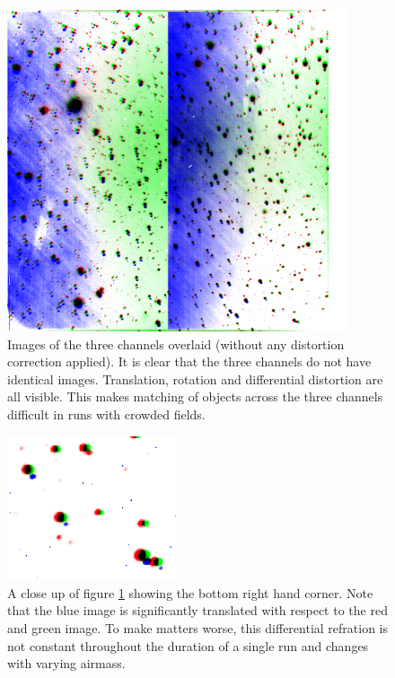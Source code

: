 \begin{figure}
  \centering
  \includegraphics[width=100mm]{images/overlay_multiply.png}
  \caption{Images of the three channels overlaid (without any distortion correction applied). It is clear that the three channels do not have identical images. Translation, rotation and differential distortion are all visible. This makes matching of objects across the three channels difficult in runs with crowded fields. }
\label{fig:nonoverlap}
\end{figure}

\begin{figure}
  \centering
  \includegraphics[width=50mm]{images/overlay_multiply_closeup.png}
  \caption{A close up of figure \ref{fig:nonoverlap} showing the bottom right hand corner. Note that the blue image is significantly translated with respect to the red and green image. To make matters worse, this differential refration is not constant throughout the duration of a single run and changes with varying airmass.}
\label{fig:nonoverlapzoom}
\end{figure}

